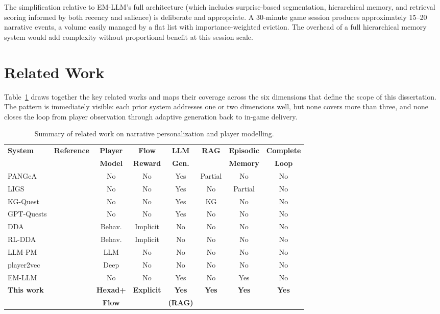 The simplification relative to EM-LLM's full architecture (which includes surprise-based segmentation, hierarchical memory, and retrieval scoring informed by both recency and salience) is deliberate and appropriate. A 30-minute game session produces approximately 15--20 narrative events, a volume easily managed by a flat list with importance-weighted eviction. The overhead of a full hierarchical memory system would add complexity without proportional benefit at this session scale.

\section{Related Work}

Table~\ref{tab:related_work} draws together the key related works and maps their coverage across the six dimensions that define the scope of this dissertation. The pattern is immediately visible: each prior system addresses one or two dimensions well, but none covers more than three, and none closes the loop from player observation through adaptive generation back to in-game delivery.

\begin{table}[H]
\centering
\caption{Summary of related work on narrative personalization and player modelling.}
\label{tab:related_work}
\footnotesize
\begin{tabular}{@{}lp{3.2cm}cccccc@{}}
\toprule
\textbf{System} & \textbf{Reference} & \textbf{Player} & \textbf{Flow} & \textbf{LLM} & \textbf{RAG} & \textbf{Episodic} & \textbf{Complete} \\
 & & \textbf{Model} & \textbf{Reward} & \textbf{Gen.} & & \textbf{Memory} & \textbf{Loop} \\
\midrule
PANGeA & \citet{todd2024pangea} & No & No & Yes & Partial & No & No \\
LIGS & \citet{ligs2025chi} & No & No & Yes & No & Partial & No \\
KG-Quest & \citet{ashby2023personalized} & No & No & Yes & KG & No & No \\
GPT-Quests & \citet{vartinen2024generating} & No & No & Yes & No & No & No \\
DDA & \citet{hunicke2004ai} & Behav. & Implicit & No & No & No & No \\
RL-DDA & \citet{climent2024framework} & Behav. & Implicit & No & No & No & No \\
LLM-PM & \citet{souza2025leveraging} & LLM & No & No & No & No & No \\
player2vec & \citet{devlin2024player2vec} & Deep & No & No & No & No & No \\
EM-LLM & \citet{fountas2024episodic} & No & No & Yes & No & Yes & No \\
\textbf{This work} & & \textbf{Hexad+} & \textbf{Explicit} & \textbf{Yes} & \textbf{Yes} & \textbf{Yes} & \textbf{Yes} \\
 & & \textbf{Flow} & & \textbf{(RAG)} & & & \\
\bottomrule
\end{tabular}
\end{table}

